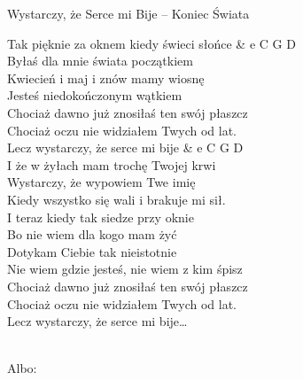 \begin{piosenka}{Wystarczy, że Serce mi Bije -- Koniec Świata}

Tak pięknie za oknem kiedy świeci słońce & e C G D \\
Byłaś dla mnie świata początkiem \\
Kwiecień i maj i znów mamy wiosnę \\
Jesteś niedokończonym wątkiem \\
Chociaż dawno już znosiłaś ten swój płaszcz \\
Chociaż oczu nie widziałem Twych od lat. \\[\zwrotkaspace]

 Lecz wystarczy, że serce mi bije & e C G D \\
 I że w żyłach mam trochę Twojej krwi \\
 Wystarczy, że wypowiem Twe imię \\
 Kiedy wszystko się wali i brakuje mi sił. \\[\zwrotkaspace]

I teraz kiedy tak siedze przy oknie \\
Bo nie wiem dla kogo mam żyć \\
Dotykam Ciebie tak nieistotnie \\
Nie wiem gdzie jesteś, nie wiem z kim śpisz \\
Chociaż dawno już znosiłaś ten swój płaszcz \\
Chociaż oczu nie widziałem Twych od lat. \\[\zwrotkaspace]

 Lecz wystarczy, że serce mi bije\ldots \\[\zwrotkaspace]

\end{piosenka}
\\[74mm]
Albo:  \\